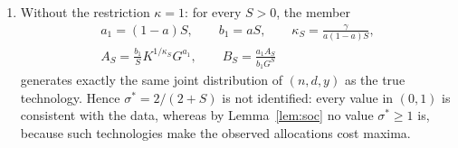 \begin{proposition}
\begin{enumerate}
\begin{enumerate}
form plus optimality.
\end{enumerate}
\item[(iv)] Without the restriction $\kappa=1$: for every $S>0$, the member
\begin{equation}\label{eq:A-family}
\begin{gathered}
a_1=(1-a)S,\qquad b_1=aS,\qquad \kappa_S=\frac{\gamma}{a(1-a)S},\\
A_S=\frac{b_1}{S}K^{1/\kappa_S}G^{a_1},\qquad B_S=\frac{a_1A_S}{b_1G^{S}}
\end{gathered}
\end{equation}
generates exactly the same joint distribution of $(n,d,y)$ as the true technology. Hence $\sigma^*=2/(2+S)$ is not
identified: every value in $(0,1)$ is consistent with the data, whereas by Lemma~\ref{lem:soc} no value $\sigma^*\ge1$ is,
because such technologies make the observed allocations cost maxima.
\end{enumerate}
\end{proposition}

